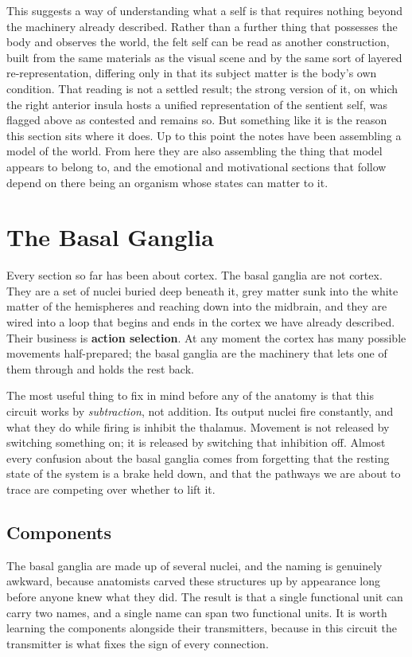 \documentclass[11pt]{article}
\begin{document}
This suggests a way of understanding what a self is that requires nothing beyond the machinery already described. Rather than a further thing that possesses the body and observes the world, the felt self can be read as another construction, built from the same materials as the visual scene and by the same sort of layered re-representation, differing only in that its subject matter is the body's own condition. That reading is not a settled result; the strong version of it, on which the right anterior insula hosts a unified representation of the sentient self, was flagged above as contested and remains so. But something like it is the reason this section sits where it does. Up to this point the notes have been assembling a model of the world. From here they are also assembling the thing that model appears to belong to, and the emotional and motivational sections that follow depend on there being an organism whose states can matter to it.


\section{The Basal Ganglia}

Every section so far has been about cortex. The basal ganglia are not cortex. They are a set of nuclei buried deep beneath it, grey matter sunk into the white matter of the hemispheres and reaching down into the midbrain, and they are wired into a loop that begins and ends in the cortex we have already described. Their business is \textbf{action selection}. At any moment the cortex has many possible movements half-prepared; the basal ganglia are the machinery that lets one of them through and holds the rest back.

The most useful thing to fix in mind before any of the anatomy is that this circuit works by \textit{subtraction}, not addition. Its output nuclei fire constantly, and what they do while firing is inhibit the thalamus. Movement is not released by switching something on; it is released by switching that inhibition off. Almost every confusion about the basal ganglia comes from forgetting that the resting state of the system is a brake held down, and that the pathways we are about to trace are competing over whether to lift it.

\subsection{Components}

The basal ganglia are made up of several nuclei, and the naming is genuinely awkward, because anatomists carved these structures up by appearance long before anyone knew what they did. The result is that a single functional unit can carry two names, and a single name can span two functional units. It is worth learning the components alongside their transmitters, because in this circuit the transmitter is what fixes the sign of every connection.
\end{document}
